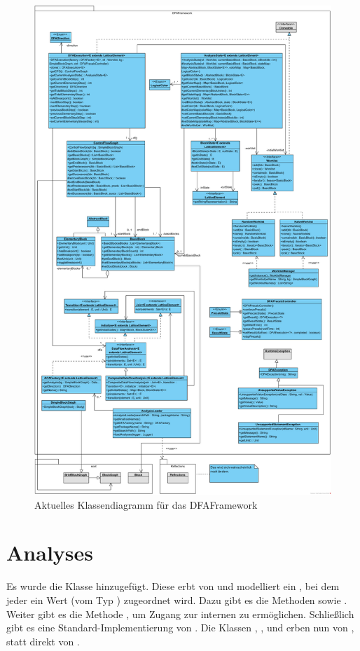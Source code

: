 \begin{figure}[H]
	\caption{Aktuelles Klassendiagramm für das DFAFramework}
	\centering
	\includegraphics[width=1.0\textwidth]{Aenderungen/Klassendiagramme/DFAFramework_Impl.png}
\end{figure}

\section{Analyses}
Es wurde die Klasse  hinzugefügt.
Diese erbt von  und modelliert ein , bei dem jeder  ein Wert (vom Typ ) zugeordnet wird.
Dazu gibt es die Methoden  sowie .
Weiter gibt es die Methode , um Zugang zur internen  zu ermöglichen.
Schließlich gibt es eine Standard-Implementierung von .
Die Klassen , ,  und  erben nun von , statt direkt von .

